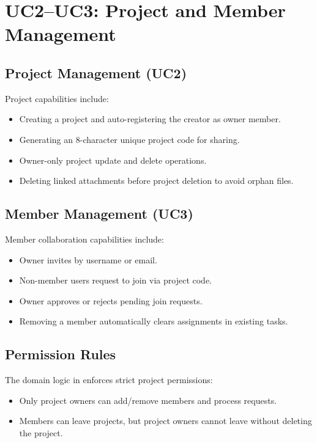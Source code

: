 \section{UC2--UC3: Project and Member Management}




\subsection{Project Management (UC2)}

Project capabilities include:
\begin{itemize}
    \item Creating a project and auto-registering the creator as owner member.
    \item Generating an 8-character unique project code for sharing.
    \item Owner-only project update and delete operations.
    \item Deleting linked attachments before project deletion to avoid orphan files.
\end{itemize}

\subsection{Member Management (UC3)}

Member collaboration capabilities include:
\begin{itemize}
    \item Owner invites by username or email.
    \item Non-member users request to join via project code.
    \item Owner approves or rejects pending join requests.
    \item Removing a member automatically clears assignments in existing tasks.
\end{itemize}

\subsection{Permission Rules}

The domain logic in  enforces strict project permissions:
\begin{itemize}
    \item Only project owners can add/remove members and process requests.
    \item Members can leave projects, but project owners cannot leave without deleting the project.
\end{itemize}

